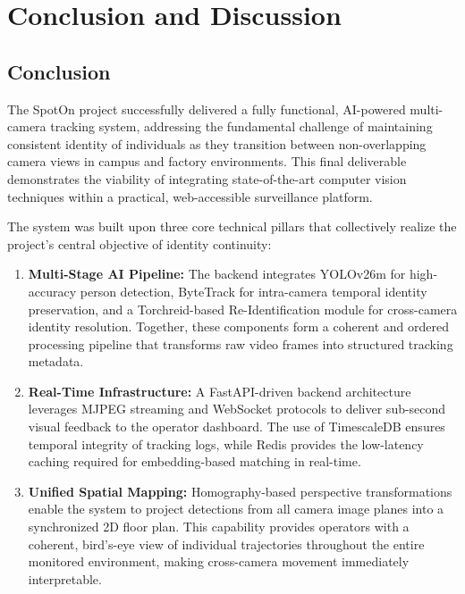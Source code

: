 \chapter{Conclusion and Discussion}
\label{chap:conclusion-and-discussion}

\section{Conclusion}
\label{section:conclusion}

The SpotOn project successfully delivered a fully functional, AI-powered multi-camera tracking system, addressing the fundamental challenge of maintaining consistent identity of individuals as they transition between non-overlapping camera views in campus and factory environments. This final deliverable demonstrates the viability of integrating state-of-the-art computer vision techniques within a practical, web-accessible surveillance platform.

The system was built upon three core technical pillars that collectively realize the project's central objective of identity continuity:

\begin{enumerate}[leftmargin=80pt]
    \item \textbf{Multi-Stage AI Pipeline:} The backend integrates YOLOv26m for high-accuracy person detection, ByteTrack for intra-camera temporal identity preservation, and a Torchreid-based Re-Identification module for cross-camera identity resolution. Together, these components form a coherent and ordered processing pipeline that transforms raw video frames into structured tracking metadata.

    \item \textbf{Real-Time Infrastructure:} A FastAPI-driven backend architecture leverages MJPEG streaming and WebSocket protocols to deliver sub-second visual feedback to the operator dashboard. The use of TimescaleDB ensures temporal integrity of tracking logs, while Redis provides the low-latency caching required for embedding-based matching in real-time.

    \item \textbf{Unified Spatial Mapping:} Homography-based perspective transformations enable the system to project detections from all camera image planes into a synchronized 2D floor plan. This capability provides operators with a coherent, bird's-eye view of individual trajectories throughout the entire monitored environment, making cross-camera movement immediately interpretable.
\end{enumerate}

